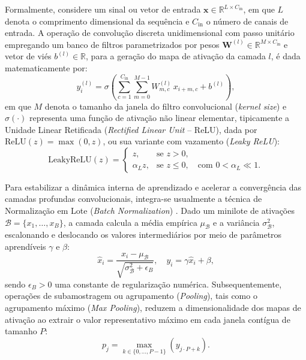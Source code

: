 Formalmente, considere um sinal ou vetor de entrada $\mathbf{x} \in \mathbb{R}^{L \times C_{\mathrm{in}}}$, em que $L$ denota o comprimento dimensional da sequência e $C_{\mathrm{in}}$ o número de canais de entrada. A operação de convolução discreta unidimensional com passo unitário empregando um banco de filtros parametrizados por pesos $\mathbf{W}^{(l)} \in \mathbb{R}^{M \times C_{\mathrm{in}}}$ e vetor de viés $b^{(l)} \in \mathbb{R}$, para a geração do mapa de ativação da camada $l$, é dada matematicamente por:
\begin{equation}
\label{eq:convolucao_1d}
y_i^{(l)} = \sigma \left( \sum_{c=1}^{C_{\mathrm{in}}} \sum_{m=0}^{M-1} W_{m,c}^{(l)} \, x_{i+m, c} + b^{(l)} \right),
\end{equation}
em que $M$ denota o tamanho da janela do filtro convolucional (\emph{kernel size}) e $\sigma(\cdot)$ representa uma função de ativação não linear elementar, tipicamente a Unidade Linear Retificada (\emph{Rectified Linear Unit} -- ReLU), dada por $\mathrm{ReLU}(z) = \max(0, z)$, ou sua variante com vazamento (\emph{Leaky ReLU}):
\begin{equation}
\label{eq:leaky_relu}
\mathrm{LeakyReLU}(z) = \begin{cases} 
z, & \text{se } z > 0, \\ 
\alpha_L z, & \text{se } z \le 0, \quad \text{com } 0 < \alpha_L \ll 1.
\end{cases}
\end{equation}

Para estabilizar a dinâmica interna de aprendizado e acelerar a convergência das camadas profundas convolucionais, integra-se usualmente a técnica de Normalização em Lote (\emph{Batch Normalization}) \cite{survey2025dl}. Dado um minilote de ativações $\mathcal{B} = \{x_1, \dots, x_B\}$, a camada calcula a média empírica $\mu_{\mathcal{B}}$ e a variância $\sigma_{\mathcal{B}}^2$, escalonando e deslocando os valores intermediários por meio de parâmetros aprendíveis $\gamma$ e $\beta$:
\begin{equation}
\label{eq:batch_norm}
\hat{x}_i = \frac{x_i - \mu_{\mathcal{B}}}{\sqrt{\sigma_{\mathcal{B}}^2 + \epsilon_B}}, \quad y_i = \gamma \hat{x}_i + \beta,
\end{equation}
sendo $\epsilon_B > 0$ uma constante de regularização numérica. Subsequentemente, operações de subamostragem ou agrupamento (\emph{Pooling}), tais como o agrupamento máximo (\emph{Max Pooling}), reduzem a dimensionalidade dos mapas de ativação ao extrair o valor representativo máximo em cada janela contígua de tamanho $P$:
\begin{equation}
\label{eq:max_pooling}
p_j = \max_{k \in \{0, \dots, P-1\}} \left( y_{j \cdot P + k} \right).
\end{equation}

